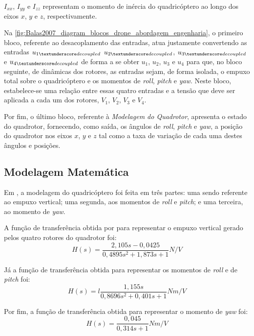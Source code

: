 $I_{xx}$, $I_{yy}$ e $I_{zz}$ representam o momento de inércia do quadricóptero ao longo dos eixos $x$, $y$ e $z$, respectivamente.

Na \autoref{fig:Balas2007_diagram_blocos_drone_abordagem_engenharia}, o primeiro bloco, referente ao desacoplamento das entradas, atua justamente convertendo as entradas $u_{1\textunderscore decoupled}$ $u_{2\textunderscore decoupled}$, $u_{3\textunderscore decoupled}$ e $u_{4\textunderscore decoupled}$ de forma a se obter $u_1$, $u_2$, $u_3$ e $u_4$ para que, no bloco seguinte, de dinâmicas dos rotores, as entradas sejam, de forma isolada, o empuxo total sobre o quadricóptero e os momentos de \textit{roll}, \textit{pitch} e \textit{yaw}. Neste bloco, estabelece-se uma relação entre essas quatro entradas e a tensão que deve ser aplicada a cada um dos rotores, $V_1$, $V_2$, $V_3$ e $V_4$.

Por fim, o último bloco, referente à \textit{Modelagem do Quadrotor}, apresenta o estado do quadrotor, fornecendo, como saída, os ângulos de \textit{roll}, \textit{pitch} e \textit{yaw}, a posição do quadrotor nos eixos $x$, $y$ e $z$ tal como a taxa de variação de cada uma destes ângulos e posições.

\subsection{Modelagem Matemática}
\label{subsec:sistemas-quadcopter-mathematical-model}

Em \cite{Balas2007}, a modelagem do quadricóptero foi feita em três partes: uma sendo referente ao empuxo vertical; uma segunda, aos momentos de \textit{roll} e \textit{pitch}; e uma terceira, ao momento de \textit{yaw}.

A função de transferência obtida por  para representar o empuxo vertical gerado pelos quatro rotores do quadrotor foi:
\begin{equation}
H(s) = \frac{2,105s-0,0425}{0,4895s^2+1,873s+1} N/V
\end{equation}

Já a função de transferência obtida para representar os momentos de \textit{roll} e de \textit{pitch} foi:
\begin{equation}
H(s) = l\frac{1,155s}{0,8696s^2+0,401s+1} Nm/V
\end{equation}

Por fim, a função de transferência obtida para representar o momento de \textit{yaw} foi:
\begin{equation}
H(s) = \frac{0,045}{0,314s+1} Nm/V
\end{equation}

